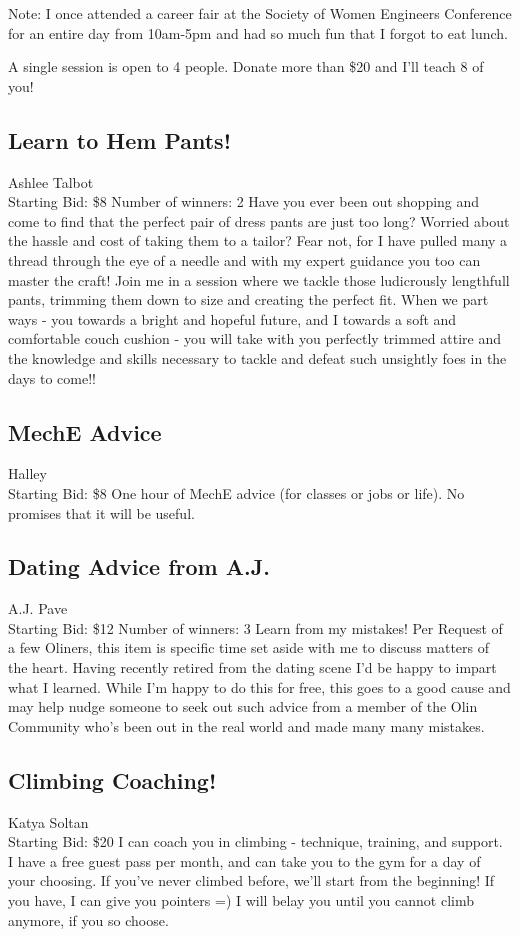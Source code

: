 \documentclass[11pt]{article}
\begin{document}
Note: I once attended a career fair at the Society of Women Engineers Conference for an entire day from 10am-5pm and had so much fun that I forgot to eat lunch.

A single session is open to 4 people. Donate more than \$20 and I'll teach 8 of you!
\subsection{Learn to Hem Pants!}
Ashlee Talbot
\\
Starting Bid: \$8
\newline
Number of winners: 2
\newline
Have you ever been out shopping and come to find that the perfect pair of dress pants are just too long? Worried about the hassle and cost of taking them to a tailor? Fear not, for I have pulled many a thread through the eye of a needle and with my expert guidance you too can master the craft! Join me in a session where we tackle those ludicrously lengthfull pants, trimming them down to size and creating the perfect fit. When we part ways - you towards a bright and hopeful future, and I towards a soft and comfortable couch cushion - you will take with you perfectly trimmed attire and the knowledge and skills necessary to tackle and defeat such unsightly foes in the days to come!!
\subsection{MechE Advice}
Halley
\\
Starting Bid: \$8
\newline
One hour of MechE advice (for classes or jobs or life). No promises that it will be useful.
\subsection{Dating Advice from A.J.}
A.J. Pave
\\
Starting Bid: \$12
\newline
Number of winners: 3
\newline
Learn from my mistakes! Per Request of a few Oliners, this item is specific time set aside with me to discuss matters of the heart. Having recently retired from the dating scene I'd be happy to impart what I learned. While I'm happy to do this for free, this goes to a good cause and may help nudge someone to seek out such advice from a member of the Olin Community who's been out in the real world and made many many mistakes.
\subsection{Climbing Coaching!}
Katya Soltan
\\
Starting Bid: \$20
\newline
I can coach you in climbing - technique, training, and support. I have a free guest pass per month, and can take you to the gym for a day of your choosing. If you've never climbed before, we'll start from the beginning! If you have, I can give you pointers =) I will belay you until you cannot climb anymore, if you so choose.
\end{document}
